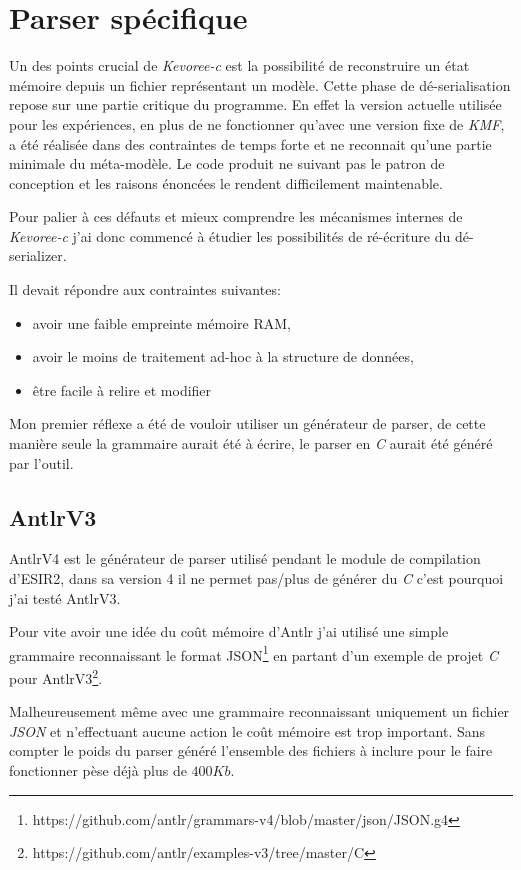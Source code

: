 \section{Parser spécifique}

Un des points crucial de \emph{Kevoree-c} est la possibilité de reconstruire un état mémoire depuis un fichier représentant un modèle. Cette phase de dé-serialisation repose sur une partie critique du programme. En effet la version actuelle utilisée pour les expériences, en plus de ne fonctionner qu'avec une version fixe de \emph{KMF}, a été réalisée dans des contraintes de temps forte et ne reconnait qu'une partie minimale du méta-modèle. Le code produit ne suivant pas le patron de conception et les raisons énoncées le rendent difficilement maintenable.

Pour palier à ces défauts et mieux comprendre les mécanismes internes de \emph{Kevoree-c} j'ai donc commencé à étudier les possibilités de ré-écriture du dé-serializer.

Il devait répondre aux contraintes suivantes:

\begin{itemize}
\item avoir une faible empreinte mémoire RAM,
\item avoir le moins de traitement ad-hoc à la structure de données,
\item être facile à relire et modifier
\end{itemize}

Mon premier réflexe a été de vouloir utiliser un générateur de parser, de cette manière seule la grammaire aurait été à écrire, le parser en \emph{C} aurait été généré par l'outil.

\subsection{AntlrV3}
AntlrV4 est le générateur de parser utilisé pendant le module de compilation d'ESIR2, dans sa version 4 il ne permet pas/plus de générer du \emph{C} c'est pourquoi j'ai testé AntlrV3.

Pour vite avoir une idée du coût mémoire d'Antlr j'ai utilisé une simple grammaire reconnaissant le format JSON\footnote{https://github.com/antlr/grammars-v4/blob/master/json/JSON.g4} en partant d'un exemple de projet \emph{C} pour AntlrV3\footnote{https://github.com/antlr/examples-v3/tree/master/C}.

Malheureusement même avec une grammaire reconnaissant uniquement un fichier \emph{JSON} et n'effectuant aucune action le coût mémoire est trop important. Sans compter le poids du parser généré l'ensemble des fichiers à inclure pour le faire fonctionner pèse déjà plus de $400Kb$.

